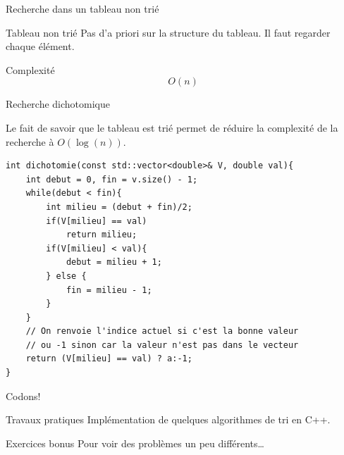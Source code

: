 \begin{frame}{Recherche dans un tableau non trié}

\begin{block}{Tableau non trié}
Pas d'a priori sur la structure du tableau. Il faut regarder chaque élément.
\end{block}

\begin{block}{Complexité}
$$O(n)$$
\end{block}

\end{frame}

\begin{frame}[fragile]{Recherche dichotomique}

Le fait de savoir que le tableau est trié permet de réduire la complexité de la recherche à $O(\log(n))$.

\begin{verbatim}
int dichotomie(const std::vector<double>& V, double val){
    int debut = 0, fin = v.size() - 1;
    while(debut < fin){
        int milieu = (debut + fin)/2;
        if(V[milieu] == val)
            return milieu;
        if(V[milieu] < val){
            debut = milieu + 1;
        } else {
            fin = milieu - 1;
        }
    }
    // On renvoie l'indice actuel si c'est la bonne valeur
    // ou -1 sinon car la valeur n'est pas dans le vecteur
    return (V[milieu] == val) ? a:-1;
}
\end{verbatim}
\end{frame}

\begin{frame}{Codons!}

\begin{block}{Travaux pratiques}
	Implémentation de quelques algorithmes de tri en C++.
\end{block}

\begin{alertblock}{Exercices bonus}
Pour voir des problèmes un peu différents\dots
\end{alertblock}
\end{frame}


